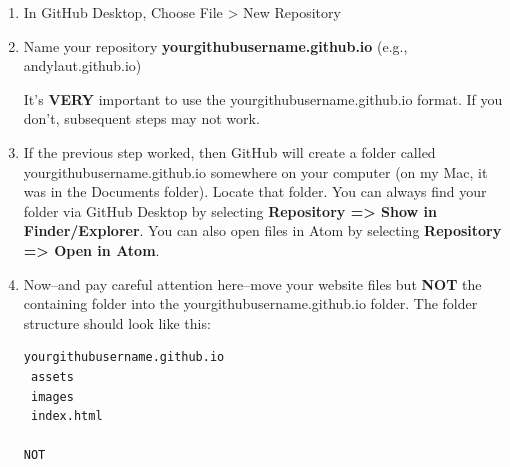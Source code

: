 \documentclass[]{book}
\theoremstyle{definition}
\theoremstyle{definition}
\theoremstyle{definition}
\theoremstyle{remark}
\begin{document}
\begin{enumerate}
\def\labelenumi{\arabic{enumi}.}
\item
  In GitHub Desktop, Choose File \textgreater{} New Repository
\item
  Name your repository \textbf{yourgithubusername.github.io} (e.g.,
  andylaut.github.io)

  It's \textbf{VERY} important to use the yourgithubusername.github.io
  format. If you don't, subsequent steps may not work.
\item
  If the previous step worked, then GitHub will create a folder called
  yourgithubusername.github.io somewhere on your computer (on my Mac, it
  was in the Documents folder). Locate that folder. You can always find
  your folder via GitHub Desktop by selecting \textbf{Repository
  =\textgreater{} Show in Finder/Explorer}. You can also open files in
  Atom by selecting \textbf{Repository =\textgreater{} Open in Atom}.
\item
  Now--and pay careful attention here--move your website files but
  \textbf{NOT} the containing folder into the
  yourgithubusername.github.io folder. The folder structure should look
  like this:

\begin{verbatim}
yourgithubusername.github.io  
 assets  
 images  
 index.html

NOT


\end{verbatim}
\end{enumerate}
\end{document}
